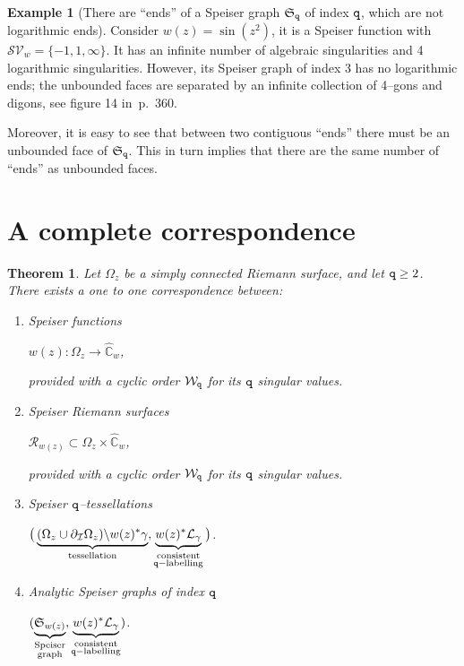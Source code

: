 \documentclass[final,3p,times]{elsarticle}
\newcommand{\CW}{\ensuremath{{\widehat{\mathbb C}}}}
\newcommand{\R}{\ensuremath{{\mathcal R}}}
\newtheorem{theorem}{Theorem}[section]
\theoremstyle{definition}
\newtheorem{example}{Example}[section]
\begin{document}
\begin{example}[There are  ``ends'' 
of a Speiser graph $\mathfrak{S}_{\tt q}$ of index $\tt q$, which are not logarithmic ends]
\label{example:ends-not-logarithmic}
Consider 
$w(z)=\sin(z^2)$, it is a Speiser function with $\mathcal{SV}_w=\{ -1,1, \infty \}$.
It has an infinite number of algebraic singularities and 4 logarithmic singularities.
However, its Speiser graph of index 3 has no logarithmic ends; 
the unbounded faces are separated by an
infinite collection of 4--gons and digons, 
see figure 14 in \cite{GoldbergOstrovskii}\,p.~360.
\end{example}

Moreover, it is easy to see that
between two contiguous ``ends'' there must be an unbounded face of $\mathfrak{S}_{\tt q}$. 
This in turn implies that there are the same number of ``ends'' as unbounded faces.


\section{A complete correspondence}

\begin{theorem}
\label{th:main-theorem}
Let $\Omega_z$ be a simply connected Riemann surface, 
and let
${\tt q} \geq 2$.
There exists a one to one correspondence between:

\begin{enumerate}[label=\arabic*),leftmargin=*]

\item
Speiser functions 

\centerline{$w(z): \Omega_z \longrightarrow \CW_w$,}

\noindent  
provided with a cyclic order $\mathcal{W}_{\tt q}$ 
for its ${\tt q}$ singular values.

\item 
Speiser Riemann surfaces 

\centerline{$\R_{w(z)} \subset  \Omega_z \times \CW_w$, }

\noindent 
provided with a cyclic order $\mathcal{W}_{\tt q}$ 
for its ${\tt q}$ singular values.

\item
Speiser $\tt q$--tessellations 

\centerline{
$
\big( 
\underbrace{(\Omega_z \cup \partial_{\mathcal{I}} \Omega_z ) \backslash w(z)^*\gamma}_{\text{tessellation}},  
\underbrace{w(z)^*\mathcal{L}_\gamma}_{\substack{ \text{consistent}\\
{\tt q}-\text{labelling}} } 
\big)
$.
}

\item
Analytic Speiser graphs of index $\tt q$

\centerline{
$(
\underbrace{\mathfrak{S}_{w(z)} }_{\substack{ \text{Speiser} \\ \text{graph} }}, 
\underbrace{ w(z)^*\mathcal{L}_\gamma }_{
\substack{ \text{consistent}\\
{\tt q}-\text{labelling}}
} )$.}

\end{enumerate}
\end{theorem}
\end{document}
